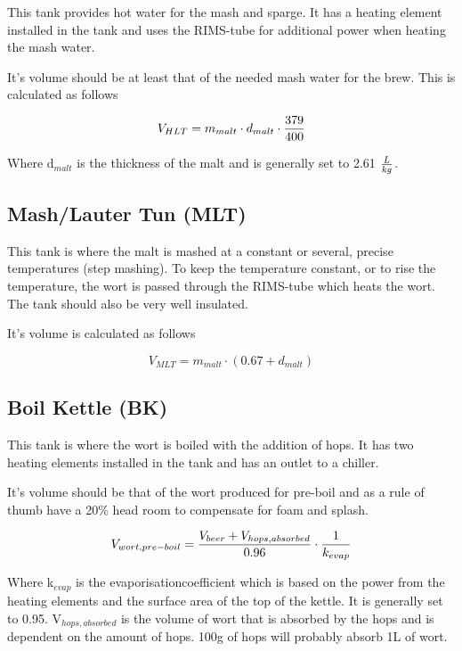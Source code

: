 \documentclass[11pt,fleqn,openany]{book} %
\begin{document}
This tank provides hot water for the mash and sparge. It has a heating element installed in the tank and uses the RIMS-tube for additional power when heating the mash water.

It's volume should be at least that of the needed mash water for the brew. This is calculated as follows

\begin{equation}
V_{HLT} = m_{malt} \cdot d_{malt} \cdot {379 \over 400}
\end{equation}

Where d$_{malt}$ is the thickness of the malt and is generally set to 2.61 $L\over kg $.

\subsection{Mash/Lauter Tun (MLT)}

This tank is where the malt is mashed at a constant or several, precise temperatures (step mashing). To keep the temperature constant, or to rise the temperature, the wort is passed through the RIMS-tube which heats the wort. The tank should also be very well insulated.

It's volume is calculated as follows

\begin{equation}
V_{MLT} = m_{malt} \cdot (0.67 + d_{malt})
\end{equation}

\subsection{Boil Kettle (BK)}

This tank is where the wort is boiled with the addition of hops. It has two heating elements installed in the tank and has an outlet to a chiller.

It's volume should be that of the wort produced for pre-boil and as a rule of thumb have a 20\% head room to compensate for foam and splash.

\begin{equation}
V_{wort, pre-boil} = {{V_{beer} + V_{hops, absorbed}} \over 0.96} \cdot {1 \over k_{evap}}
\end{equation}

Where k$_{evap}$ is the evaporisationcoefficient which is based on the power from the heating elements and the surface area of the top of the kettle. It is generally set to 0.95. V$_{hops, absorbed}$ is the volume of wort that is absorbed by the hops and is dependent on the amount of hops. 100g of hops will probably absorb 1L of wort.
\end{document}
